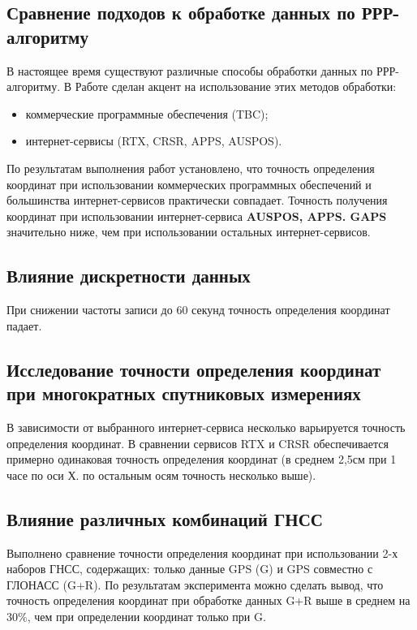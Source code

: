 \subsection*{Сравнение подходов к обработке данных по РРР-алгоритму}\label{subsec:ch2/sec4/sub-2}

В настоящее время существуют различные способы обработки данных по РРР-алгоритму. В Работе сделан акцент на использование этих методов обработки:
\begin{itemize}
	\item коммерческие программные обеспечения (TBC);
	\item интернет-сервисы (RTX, CRSR, APPS, AUSPOS).
\end{itemize}
По результатам выполнения работ установлено, что точность определения координат при использовании коммерческих программных обеспечений и большинства интернет-сервисов практически совпадает. Точность получения координат при использовании интернет-сервиса \textbf{AUSPOS, APPS. GAPS} значительно ниже, чем при использовании остальных интернет-сервисов.

\subsection*{Влияние дискретности данных}\label{subsec:ch2/sec4/sub-3}

При снижении частоты записи до 60 секунд точность определения координат падает.

\subsection*{Исследование точности определения координат при многократных спутниковых измерениях}\label{subsec:ch2/sec4/sub-4}

В зависимости от выбранного интернет-сервиса несколько варьируется точность определения координат. В сравнении сервисов RTX и CRSR обеспечивается примерно одинаковая точность определения координат (в среднем 2,5\thinspace см при 1 часе по оси Х. по остальным осям точность несколько выше).

\subsection*{Влияние различных комбинаций ГНСС}\label{subsec:ch2/sec4/sub-5}

Выполнено сравнение точности определения координат при использовании 2-х наборов ГНСС, содержащих: только данные GPS (G) и GPS совместно с ГЛОНАСС (G+R). По результатам эксперимента можно сделать вывод, что точность определения координат при обработке данных G+R выше в среднем на 30\%, чем при определении координат только при G.

